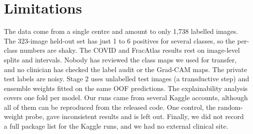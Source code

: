 \section{Limitations}
The data come from a single centre and amount to only 1,738 labelled images. The 323-image held-out set has just 1 to 6 positives for several classes, so the per-class numbers are shaky. The COVID and FracAtlas results rest on image-level splits and intervals. Nobody has reviewed the class maps we used for transfer, and no clinician has checked the label audit or the Grad-CAM maps. The private test labels are noisy. Stage 2 uses unlabelled test images (a transductive step) and ensemble weights fitted on the same OOF predictions. The explainability analysis covers one fold per model. Our runs came from several Kaggle accounts, although all of them can be reproduced from the released code. One control, the random-weight probe, gave inconsistent results and is left out. Finally, we did not record a full package list for the Kaggle runs, and we had no external clinical site.


